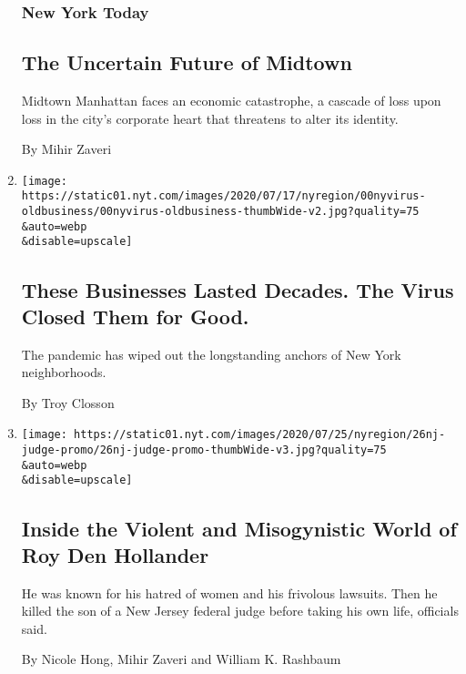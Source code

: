 \begin{enumerate}
{  \subsubsection{New York Today}\label{new-york-today-1}}

  \hypertarget{the-uncertain-future-of-midtown}{%
  \subsection{The Uncertain Future of
  Midtown}\label{the-uncertain-future-of-midtown}}

  Midtown Manhattan faces an economic catastrophe, a cascade of loss
  upon loss in the city's corporate heart that threatens to alter its
  identity.~

  By Mihir Zaveri
\item
  \href{/2020/07/27/nyregion/coronavirus-small-business-nyc.html}{}

  \texttt{[image: https://static01.nyt.com/images/2020/07/17/nyregion/00nyvirus-oldbusiness/00nyvirus-oldbusiness-thumbWide-v2.jpg?quality=75\\\&auto=webp\\\&disable=upscale]}

  \hypertarget{these-businesses-lasted-decades-the-virus-closed-them-for-good}{%
  \subsection{These Businesses Lasted Decades. The Virus Closed Them for
  Good.}\label{these-businesses-lasted-decades-the-virus-closed-them-for-good}}

  The pandemic has wiped out the longstanding anchors of New York
  neighborhoods.

  By Troy Closson
\item
  \href{/2020/07/26/nyregion/roy-den-hollander-judge.html}{}

  \texttt{[image: https://static01.nyt.com/images/2020/07/25/nyregion/26nj-judge-promo/26nj-judge-promo-thumbWide-v3.jpg?quality=75\\\&auto=webp\\\&disable=upscale]}

  \hypertarget{inside-the-violent-and-misogynistic-world-of-roy-den-hollander}{%
  \subsection{Inside the Violent and Misogynistic World of Roy Den
  Hollander}\label{inside-the-violent-and-misogynistic-world-of-roy-den-hollander}}

  He was known for his hatred of women and his frivolous lawsuits. Then
  he killed the son of a New Jersey federal judge before taking his own
  life, officials said.

  By Nicole Hong, Mihir Zaveri and William K. Rashbaum
\end{enumerate}

